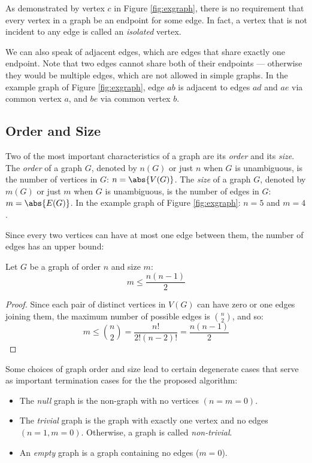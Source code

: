 As demonstrated by vertex \(c\) in Figure \ref{fig:exgraph}, there is no requirement that every vertex in a graph
be an endpoint for some edge.  In fact, a vertex that is not incident to any edge is called an \emph{isolated}
vertex.

We can also speak of adjacent edges, which are edges that share exactly one endpoint.  Note that two edges cannot
share both of their endpoints --- otherwise they would be multiple edges, which are not allowed in simple graphs.
In the example graph of Figure \ref{fig:exgraph}, edge \(ab\) is adjacent to edges \(ad\) and \(ae\) via common
vertex \(a\), and \(be\) via common vertex \(b\).

\subsection{Order and Size}

Two of the most important characteristics of a graph are its \emph{order} and its \emph{size}.  The \emph{order} of
a graph \(G\), denoted by \(n(G)\) or just \(n\) when \(G\) is unambiguous, is the number of vertices in \(G\):
\(n=\abs{V(G)}\).  The \emph{size} of a graph \(G\), denoted by \(m(G)\) or just \(m\) when \(G\) is unambiguous,
is the number of edges in \(G\): \(m=\abs{E(G)}\).  In the example graph of Figure \ref{fig:exgraph}: \(n=5\) and
\(m=4\).

Since every two vertices can have at most one edge between them, the number of edges has an upper bound:

\begin{theorem}
  Let \(G\) be a graph of order \(n\) and size \(m\):
  \[m\le\frac{n(n-1)}{2}\]
\end{theorem}

\begin{proof}
  Since each pair of distinct vertices in \(V(G)\) can have zero or one edges joining them, the maximum number of
  possible edges is \(\binom{n}{2}\), and so:
  \[m\le\binom{n}{2}=\frac{n!}{2!(n-2)!}=\frac{n(n-1)}{2}\]
\end{proof}

Some choices of graph order and size lead to certain degenerate cases that serve as important termination cases for
the the proposed algorithm:
\begin{itemize}
\item The \emph{null} graph is the non-graph with no vertices \((n=m=0)\).
\item The \emph{trivial} graph is the graph with exactly one vertex and no edges \((n=1,m=0)\).  Otherwise, a graph
  is called \emph{non-trivial}.
\item An \emph{empty} graph is a graph containing no edges (\(m=0\)).
\end{itemize}

